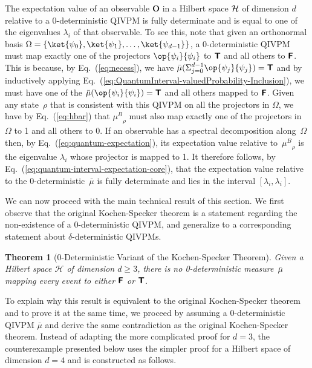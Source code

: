 \documentclass[english,reprint, aps, prl,superscriptaddress, showpacs,
showkeys, longbibliography, amsmath, amssymb, floatfix]{revtex4-1}
\theoremstyle{plain}
\newtheorem{thm}{Theorem}
\theoremstyle{definition}
\newcommand{\Hilb}{\mathcal{H}}
\newcommand{\imposs}{\textbf{\textsf{F}}}
\newcommand{\necess}{\textbf{\textsf{T}}}
\newcommand{\proj}[1]{\op{#1}{#1}}
\newcommand{\muB}{\ensuremath{\mu^{B}}}
\begin{document}
The expectation value of an observable $\mathbf{O}$ in a Hilbert space
${\cal H}$ of dimension $d$ relative to a 0-deterministic QIVPM is
fully determinate and is equal to one of the eigenvalues $\lambda_i$
of that observable. To see this, note that given an orthonormal basis
$\Omega=\{ \ket{\psi_0},\ket{\psi_1},\ldots,\ket{\psi_{d-1}}\}$, a
0-deterministic QIVPM must map exactly one of the projectors
$\proj{\psi_i}$ to $\necess$ and all others to $\imposs$. This is
because, by Eq.~(\ref{eq:necess}), we have
$\bar{\mu}(\Sigma_{j=0}^{d-1}{\proj{\psi_j}})=\necess$ and by
inductively applying
Eq.~(\ref{eq:QuantumInterval-valuedProbability-Inclusion}), we must
have one of the $\bar{\mu}(\proj{\psi_i})=\necess$ and all others
mapped to $\imposs$. Given any state~$\rho$ that is consistent with
this QIVPM on all the projectors in $\Omega$, we have by
Eq.~(\ref{eq:hbar}) that $\muB_{\rho}$ must also map exactly one of
the projectors in $\Omega$ to 1 and all others to 0. If an observable
has a spectral decomposition along~$\Omega$ then, by
Eq.~(\ref{eq:quantum-expectation}), its expectation value relative
to~$\muB_{\rho}$ is the eigenvalue $\lambda_i$ whose projector is
mapped to 1. It therefore follows, by
Eq.~(\ref{eq:quantum-interval-expectation-core}), that the expectation
value relative to the 0-deterministic~${\bar{\mu}}$ is fully
determinate and lies in the interval $[\lambda_i,\lambda_i]$.

We can now proceed with the main technical result of this section. We
first observe that the original Kochen-Specker theorem is a statement
regarding the non-existence of a $0$-deterministic QIVPM, and
generalize to a corresponding statement about $\delta$-deterministic QIVPMs.

\begin{thm}[0-Deterministic Variant of the Kochen-Specker
  Theorem] \label{thm:Kochen-Specker} Given a Hilbert space $\Hilb$ of
  dimension $d\ge3$, there is no 0-deterministic measure~$\bar{\mu}$
  mapping every event to either $\imposs$ or $\necess$.
\end{thm}

\noindent To explain why this result is equivalent to the original
Kochen-Specker theorem and to prove it at the same time, we proceed by
assuming a 0-deterministic QIVPM $\bar{\mu}$ and derive the same
contradiction as the original Kochen-Specker theorem. Instead of
adapting the more complicated proof for $d=3$, the counterexample
presented below uses the simpler proof for a Hilbert space of
dimension $d=4$ and is constructed as follows.
\end{document}
